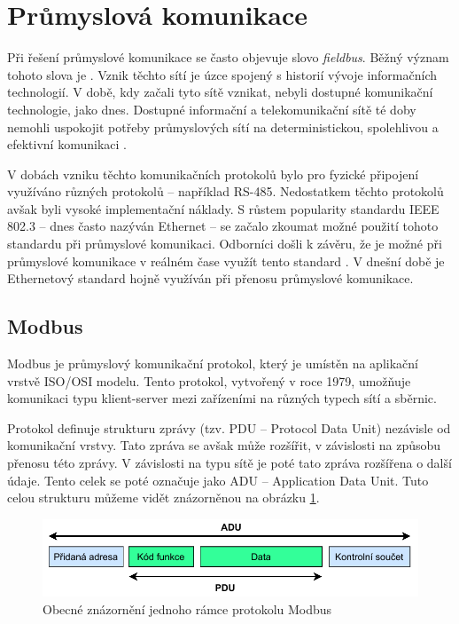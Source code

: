 \section{Průmyslová komunikace}

Při řešení průmyslové komunikace se často objevuje slovo \textit{fieldbus}. Běžný význam tohoto slova je  \cite{fieldbus_thomesse}. Vznik těchto sítí je úzce spojený s historií vývoje informačních technologií. V době, kdy začali tyto sítě vznikat, nebyli dostupné komunikační technologie, jako dnes. Dostupné informační a telekomunikační sítě té doby nemohli uspokojit potřeby průmyslových sítí na deterministickou, spolehlivou a efektivní komunikaci \cite{future_of_ind_com}. 

V dobách vzniku těchto komunikačních protokolů bylo pro fyzické připojení využíváno různých protokolů -- například RS-485. Nedostatkem těchto protokolů avšak byli vysoké implementační náklady. S růstem popularity standardu IEEE 802.3 -- dnes často nazýván Ethernet -- se začalo zkoumat možné použití tohoto standardu při průmyslové komunikaci. Odborníci došli k závěru, že je možné při průmyslové komunikace v reálném čase využít tento standard \cite{lee_ethernet_fieldbus}. V dnešní době je Ethernetový standard hojně využíván při přenosu průmyslové komunikace.


\subsection{Modbus}
Modbus je průmyslový komunikační protokol, který je umístěn na aplikační vrstvě ISO/OSI modelu. Tento protokol, vytvořený v roce 1979, umožňuje komunikaci typu klient-server mezi zařízeními na různých typech sítí a sběrnic. 

Protokol definuje strukturu zprávy (tzv. PDU -- Protocol Data Unit) nezávisle od komunikační vrstvy. Tato zpráva se avšak může rozšířit, v závislosti na způsobu přenosu této zprávy. V závislosti na typu sítě je poté tato zpráva rozšířena o další údaje. Tento celek se poté označuje jako ADU -- Application Data Unit. Tuto celou strukturu můžeme vidět znázorněnou na obrázku \ref{fig:modbus_frame}.~\cite{modbus}

\begin{figure}[htbp]
    \centering 
    \includegraphics[width=\textwidth]{assets/img/modbusframe.pdf}
    \caption{Obecné znázornění jednoho rámce protokolu Modbus}
    \label{fig:modbus_frame}
\end{figure}

